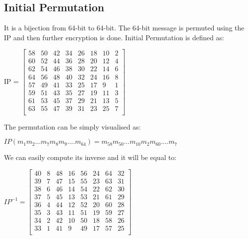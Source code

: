 \documentclass[11pt]{article}
\begin{document}
\subsection{Initial Permutation}
It is a bijection from 64-bit to 64-bit. The 64-bit message is permuted using the IP and then further encryption is done. Initial Permutation is defined as:
\begin{center}
IP =  
    $\begin{bmatrix}
    58 & 50 & 42 & 34 & 26 & 18 & 10 & 2\\
    60 & 52 & 44 & 36 & 28 & 20 & 12 & 4\\
    62 & 54 & 46 & 38 & 30 & 22 & 14 & 6\\
    64 & 56 & 48 & 40 & 32 & 24 & 16 & 8\\
    57 & 49 & 41 & 33 & 25 & 17 & 9 & 1\\
    59 & 51 & 43 & 35 & 27 & 19 & 11 & 3\\
    61 & 53 & 45 & 37 & 29 & 21 & 13 & 5\\
    63 & 55 & 47 & 39 & 31 & 23 & 25 & 7\\
    \end{bmatrix}$
\end{center}
The permutation can be simply visualised as:
\begin{center}
    $IP(m_1m_2...m_7m_8m_9....m_{64}) = m_{58}m_{50}...m_{10}m_2m_{60}....m_7 $
\end{center}
We can easily compute its inverse and it will be equal to:
\begin{center}
    $IP^{-1} = 
    \begin{bmatrix}
        40 & 8 & 48 & 16 & 56 & 24 & 64 & 32\\
        39 & 7 & 47 & 15 & 55 & 23 & 63 & 31\\
        38 & 6 & 46 & 14 & 54 & 22 & 62 & 30\\
        37 & 5 & 45 & 13 & 53 & 21 & 61 & 29\\
        36 & 4 & 44 & 12 & 52 & 20 & 60 & 28\\
        35 & 3 & 43 & 11 & 51 & 19 & 59 & 27\\
        34 & 2 & 42 & 10 & 50 & 18 & 58 & 26\\
        33 & 1 & 41 & 9 & 49 & 17 & 57 & 25\\
    \end{bmatrix}$
\end{center}
\end{document}
